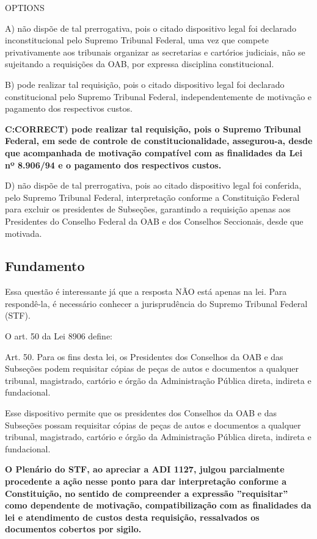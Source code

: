 \documentclass[12pt]{article}
\begin{document}
OPTIONS

A) não dispõe de tal prerrogativa, pois o citado dispositivo 
legal foi declarado inconstitucional pelo Supremo Tribunal 
Federal, uma vez que compete privativamente aos 
tribunais organizar as secretarias e cartórios judiciais, não 
se sujeitando a requisições da OAB, por expressa disciplina 
constitucional. 

B) pode realizar tal requisição, pois o citado dispositivo legal 
foi declarado constitucional pelo Supremo Tribunal 
Federal, independentemente de motivação e pagamento 
dos respectivos custos. 

\textbf{C:CORRECT) pode realizar tal requisição, pois o Supremo Tribunal Federal, em sede de controle de constitucionalidade, 
assegurou-a, desde que acompanhada de motivação 
compatível com as finalidades da Lei nº 8.906/94 e o 
pagamento dos respectivos custos.} 

D) não dispõe de tal prerrogativa, pois ao citado dispositivo 
legal foi conferida, pelo Supremo Tribunal Federal, 
interpretação conforme a Constituição Federal para excluir 
os presidentes de Subseções, garantindo a requisição 
apenas aos Presidentes do Conselho Federal da OAB e dos 
Conselhos Seccionais, desde que motivada. 

\subsection{Fundamento}

Essa questão é interessante já que a resposta NÃO está apenas na lei. Para respondê-la, é necessário conhecer a jurisprudência do Supremo Tribunal Federal (STF). 

O art. 50 da Lei 8906 define: 

Art. 50. Para os fins desta lei, os Presidentes dos Conselhos da OAB e das Subseções podem requisitar cópias de peças de autos e documentos a qualquer tribunal, magistrado, cartório e órgão da Administração Pública direta, indireta e fundacional.       

Esse dispositivo permite que os presidentes dos Conselhos da OAB e das Subseções possam requisitar cópias de peças de autos e documentos a qualquer tribunal, magistrado, cartório e órgão da Administração Pública direta, indireta e fundacional. 

\textbf{O Plenário do STF, ao apreciar a ADI 1127, julgou parcialmente procedente a ação nesse ponto para dar interpretação conforme a Constituição, no sentido de compreender a expressão ''requisitar'' como dependente de motivação, compatibilização com as finalidades da lei e atendimento de custos desta requisição, ressalvados os documentos cobertos por sigilo.}
\end{document}

